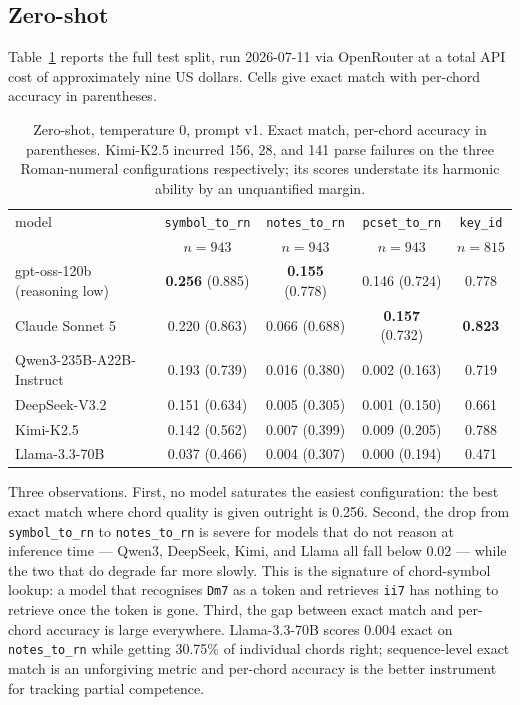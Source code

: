 \documentclass[11pt]{article}
\begin{document}
\subsection{Zero-shot}

Table~\ref{tab:main} reports the full test split, run 2026-07-11 via OpenRouter
at a total API cost of approximately nine US dollars. Cells give exact match with
per-chord accuracy in parentheses.

\begin{table}[h]
\centering
\small
\begin{tabular}{lcccc}
\toprule
model & \texttt{symbol\_to\_rn} & \texttt{notes\_to\_rn} & \texttt{pcset\_to\_rn} & \texttt{key\_id} \\
 & $n{=}943$ & $n{=}943$ & $n{=}943$ & $n{=}815$ \\
\midrule
gpt-oss-120b (reasoning low) & \textbf{0.256} (0.885) & \textbf{0.155} (0.778) & 0.146 (0.724) & 0.778 \\
Claude Sonnet 5              & 0.220 (0.863) & 0.066 (0.688) & \textbf{0.157} (0.732) & \textbf{0.823} \\
Qwen3-235B-A22B-Instruct     & 0.193 (0.739) & 0.016 (0.380) & 0.002 (0.163) & 0.719 \\
DeepSeek-V3.2                & 0.151 (0.634) & 0.005 (0.305) & 0.001 (0.150) & 0.661 \\
Kimi-K2.5                    & 0.142 (0.562) & 0.007 (0.399) & 0.009 (0.205) & 0.788 \\
Llama-3.3-70B                & 0.037 (0.466) & 0.004 (0.307) & 0.000 (0.194) & 0.471 \\
\bottomrule
\end{tabular}
\caption{Zero-shot, temperature 0, prompt v1. Exact match, per-chord accuracy in
parentheses. Kimi-K2.5 incurred 156, 28, and 141 parse failures on the three
Roman-numeral configurations respectively; its scores understate its harmonic
ability by an unquantified margin.}
\label{tab:main}
\end{table}

Three observations. First, no model saturates the easiest configuration: the
best exact match where chord quality is given outright is 0.256. Second, the drop
from \texttt{symbol\_to\_rn} to \texttt{notes\_to\_rn} is severe for models that
do not reason at inference time --- Qwen3, DeepSeek, Kimi, and Llama all fall
below 0.02 --- while the two that do degrade far more slowly. This is the
signature of chord-symbol lookup: a model that recognises \texttt{Dm7} as a token
and retrieves \texttt{ii7} has nothing to retrieve once the token is gone.
Third, the gap between exact match and per-chord accuracy is large everywhere.
Llama-3.3-70B scores 0.004 exact on \texttt{notes\_to\_rn} while getting 30.75\%
of individual chords right; sequence-level exact match is an unforgiving metric
and per-chord accuracy is the better instrument for tracking partial competence.
\end{document}
